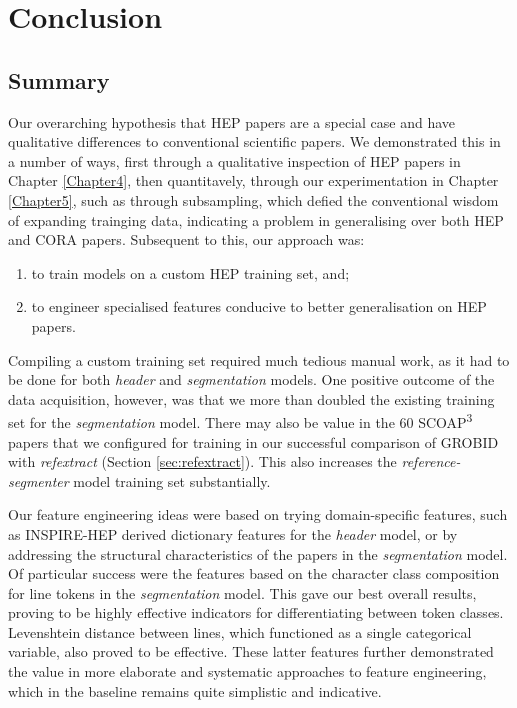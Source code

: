 
\chapter{Conclusion} %

\label{Chapter6} %



\section{Summary}

Our overarching hypothesis that HEP papers are a special case and have qualitative differences to conventional scientific papers. We demonstrated this in a number of ways, first through a qualitative inspection of HEP papers in Chapter \ref{Chapter4}, then quantitavely, through our experimentation in Chapter \ref{Chapter5}, such as through subsampling, which defied the conventional wisdom of expanding trainging data, indicating a problem in generalising over both HEP and CORA papers. Subsequent to this, our approach was:

\begin{enumerate}
\item to train models on a custom HEP training set, and;
\item to engineer specialised features conducive to better generalisation on HEP papers.
\end{enumerate}

Compiling a custom training set required much tedious manual work, as it had to be done for both \emph{header} and \emph{segmentation} models.  One positive outcome of the data acquisition, however, was that we more than doubled the existing training set for the \emph{segmentation} model. There may also be value in the 60 SCOAP\textsuperscript{3} papers that we configured for training in our successful comparison of GROBID with \emph{refextract} (Section \ref{sec:refextract}). This also increases the \emph{reference-segmenter} model training set substantially.

Our feature engineering ideas were based on trying domain-specific features, such as INSPIRE-HEP derived dictionary features for the \emph{header} model, or by addressing the structural characteristics of the papers in the \emph{segmentation} model. Of particular success were the features based on the character class composition for line tokens in the \emph{segmentation} model. This gave our best overall results, proving to be highly effective indicators for differentiating between token classes. Levenshtein distance between lines, which functioned as a single categorical variable, also proved to be effective. These latter features further demonstrated the value in more elaborate and systematic approaches to feature engineering, which in the baseline remains quite simplistic and indicative. 

